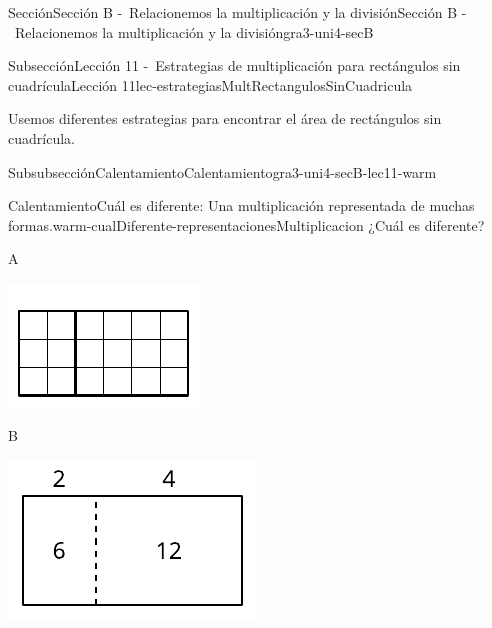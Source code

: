 \documentclass[twoside,10pt,]{article}
\begin{document}
\begin{sectionptx}{Sección}{Sección B -~Relacionemos la multiplicación y la división}{}{Sección B -~Relacionemos la multiplicación y la división}{}{}{gra3-uni4-secB}
%
\begin{subsectionptx}{Subsección}{Lección 11 -~Estrategias de multiplicación para rectángulos sin cuadrícula}{}{Lección 11}{}{}{lec-estrategiasMultRectangulosSinCuadricula}
\begin{introduction}{}%
Usemos diferentes estrategias para encontrar el área de rectángulos sin cuadrícula.%
\end{introduction}%
%
%
\typeout{************************************************}
\typeout{************************************************}
%
\begin{subsubsectionptx}{Subsubsección}{Calentamiento}{}{Calentamiento}{}{}{gra3-uni4-secB-lec11-warm}
\begin{exploration}{Calentamiento}{Cuál es diferente: Una multiplicación representada de muchas formas.}{warm-cualDiferente-representacionesMultiplicacion}%
¿Cuál es diferente?%
\begin{sidebyside}{2}{0.05}{0.05}{0.1}%
\begin{sbspanel}{0.4}%
A%
\par
\includegraphics[width=\linewidth]{external/svg-source/tikz-file-153081.pdf}
\end{sbspanel}%
\begin{sbspanel}{0.4}%
B%
\par
\includegraphics[width=\linewidth]{external/svg-source/tikz-file-153082-scale13.pdf}

\end{sbspanel}
\end{sidebyside}
\end{exploration}
\end{subsubsectionptx}
\end{subsectionptx}
\end{sectionptx}
\end{document}
